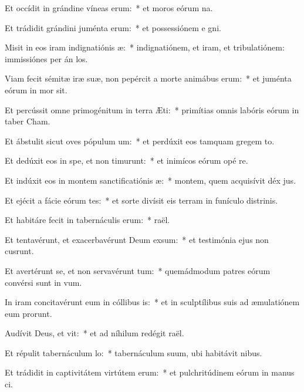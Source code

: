 \item Et occídit in grándine víneas erum:~* et moros eórum  na.
\item Et trádidit grándini juménta erum:~* et possessiónem e gni.
\item Misit in eos iram indignatiónis æ:~* indignatiónem, et iram, et tribulatiónem: immissiónes per án los.
\item Viam fecit sémitæ iræ suæ, non pepércit a morte animábus erum:~* et juménta eórum in mor sit.
\item Et percússit omne primogénitum in terra Æti:~* primítias omnis labóris eórum in taber Cham.
\item Et ábstulit sicut oves pópulum um:~* et perdúxit eos tamquam gregem  to.
\item Et dedúxit eos in spe, et non timurunt:~* et inimícos eórum opé re.
\item Et indúxit eos in montem sanctificatiónis æ:~* montem, quem acquisívit déx jus.
\item Et ejécit a fácie eórum tes:~* et sorte divísit eis terram in funículo distrinis.
\item Et habitáre fecit in tabernáculis erum:~*  raël.
\item Et tentavérunt, et exacerbavérunt Deum exsum:~* et testimónia ejus non cusrunt.
\item Et avertérunt se, et non servavérunt tum:~* quemádmodum patres eórum convérsi sunt in  vum.
\item In iram concitavérunt eum in cóllibus is:~* et in sculptílibus suis ad æmulatiónem eum prorunt.
\item Audívit Deus, et vit:~* et ad níhilum redégit  raël.
\item Et répulit tabernáculum lo:~* tabernáculum suum, ubi habitávit  nibus.
\item Et trádidit in captivitátem virtútem erum:~* et pulchritúdinem eórum in manus ci.
